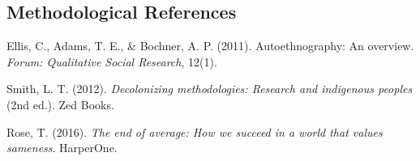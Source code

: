 \documentclass[12pt,letterpaper]{article}
\begin{document}
\subsection*{Methodological References}

Ellis, C., Adams, T. E., \& Bochner, A. P. (2011). Autoethnography: An overview. \textit{Forum: Qualitative Social Research}, 12(1).

Smith, L. T. (2012). \textit{Decolonizing methodologies: Research and indigenous peoples} (2nd ed.). Zed Books.

Rose, T. (2016). \textit{The end of average: How we succeed in a world that values sameness}. HarperOne.

\end{document}
